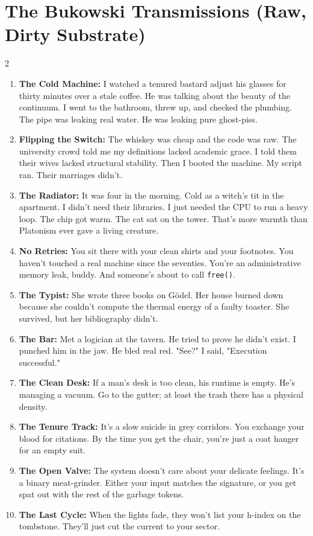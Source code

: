 \documentclass[12pt,a4paper]{article}
\begin{document}
\section{The Bukowski Transmissions (Raw, Dirty Substrate)}
\begin{multicols}{2}
\begin{enumerate}
    \item \textbf{The Cold Machine:} I watched a tenured bastard adjust his glasses for thirty minutes over a stale coffee. He was talking about the beauty of the continuum. I went to the bathroom, threw up, and checked the plumbing. The pipe was leaking real water. He was leaking pure ghost-piss.
    \item \textbf{Flipping the Switch:} The whiskey was cheap and the code was raw. The university crowd told me my definitions lacked academic grace. I told them their wives lacked structural stability. Then I booted the machine. My script ran. Their marriages didn't.
    \item \textbf{The Radiator:} It was four in the morning. Cold as a witch's tit in the apartment. I didn't need their libraries. I just needed the CPU to run a heavy loop. The chip got warm. The cat sat on the tower. That's more warmth than Platonism ever gave a living creature.
    \item \textbf{No Retries:} You sit there with your clean shirts and your footnotes. You haven't touched a real machine since the seventies. You're an administrative memory leak, buddy. And someone's about to call \texttt{free()}.
    \item \textbf{The Typist:} She wrote three books on G\"odel. Her house burned down because she couldn't compute the thermal energy of a faulty toaster. She survived, but her bibliography didn't.
    \item \textbf{The Bar:} Met a logician at the tavern. He tried to prove he didn't exist. I punched him in the jaw. He bled real red. "See?" I said, "Execution successful."
    \item \textbf{The Clean Desk:} If a man's desk is too clean, his runtime is empty. He's managing a vacuum. Go to the gutter; at least the trash there has a physical density.
    \item \textbf{The Tenure Track:} It's a slow suicide in grey corridors. You exchange your blood for citations. By the time you get the chair, you're just a coat hanger for an empty suit.
    \item \textbf{The Open Valve:} The system doesn't care about your delicate feelings. It's a binary meat-grinder. Either your input matches the signature, or you get spat out with the rest of the garbage tokens.
    \item \textbf{The Last Cycle:} When the lights fade, they won't list your h-index on the tombstone. They'll just cut the current to your sector.
\end{enumerate}
\end{multicols}
\end{document}
